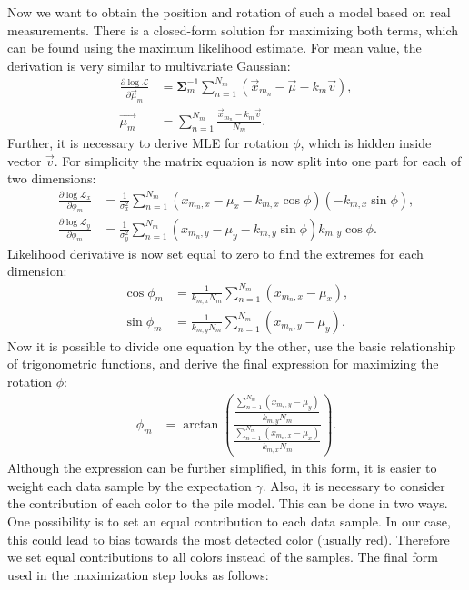  Now we want to obtain the position and rotation of such a model based on real measurements. There is a closed-form solution for maximizing both terms, which can be found using the maximum likelihood estimate. For mean value, the derivation is very similar to multivariate Gaussian:
\begin{align}
\frac{\partial \log\mathcal{L} }{\partial \vec{\mu}_m} &=  \bm{\Sigma}^{-1}_m \sum_{n = 1}^{N_m} (\vec{x}_{m_n} - \vec{\mu} - k_m \vec{v}), \\
\vec{\mu_m} &= \sum_{n = 1}^{N_m} \frac{\vec{x}_{m_n} - k_m \vec{v}}{N_m}.
\end{align}
Further, it is necessary to derive MLE for rotation $\phi$, which is hidden inside vector $\vec{v}$. For simplicity the matrix equation is now split into one part for each of two dimensions:
\begin{align}
\frac{\partial \log\mathcal{L}_x }{\partial \phi_m} &= \frac{1}{\sigma^2_x} \sum_{n=1}^{N_m} (x_{m_n, x} - \mu_x - k_{m, x} \cos \phi) \left( -k_{m,x} \sin \phi\right),  \\
\frac{\partial \log\mathcal{L}_y }{\partial \phi_m} &= \frac{1}{\sigma^2_y} \sum_{n=1}^{N_m} (x_{m_n, y} - \mu_y - k_{m, y} \sin \phi) k_{m,y} \cos \phi.
\end{align}
Likelihood derivative is now set equal to zero to find the extremes for each dimension:
\begin{align}
\cos \phi_m &= \frac{1}{k_{m, x}N_m} \sum_{n = 1}^{N_m} \left(  x_{m_n, x} - \mu_x \right)  , \\ 
\sin \phi_m &=  \frac{1}{k_{m, y}N_m} \sum_{n = 1}^{N_m} \left(  x_{m_n, y} - \mu_y \right)  .
\end{align}
Now it is possible to divide one equation by the other, use the basic relationship of trigonometric functions, and derive the final expression for maximizing the rotation $\phi$:
\begin{align}
\phi_m &= \arctan \left( \frac{\dfrac{\sum_{n = 1}^{N_m} \left( x_{m_n, y} - \mu_y \right)}{k_{m, y}N_m} }{ \dfrac{\sum_{n = 1}^{N_m} \left( x_{m_n, x} - \mu_x \right)}{k_{m, x}N_m} }\right).
\end{align}
Although the expression can be further simplified, in this form, it is easier to weight each data sample by the expectation $\gamma$. Also, it is necessary to consider the contribution of each color to the pile model. This can be done in two ways. One possibility is to set an equal contribution to each data sample. In our case, this could lead to bias towards the most detected color (usually red). Therefore we set equal contributions to all colors instead of the samples. The final form used in the maximization step looks as follows:
